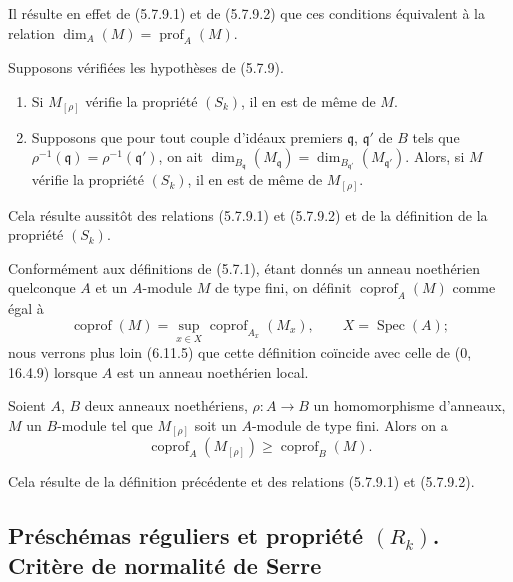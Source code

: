 Il résulte en effet de (5.7.9.1) et de (5.7.9.2) que ces conditions
équivalent à la relation
$\dim_A(M)=\operatorname{prof}_A(M)$.

\begin{corollary}[5.7.11]
\label{IV.2.s5.7.11-fr}
Supposons vérifiées les hypothèses de (5.7.9).
\begin{enumerate}
\item[(i)] Si $M_{[\rho]}$ vérifie la propriété $(S_k)$, il en est de même
de $M$.
\item[(ii)] Supposons que pour tout couple d'idéaux premiers
$\mathfrak q$, $\mathfrak q'$ de $B$ tels que
$\rho^{-1}(\mathfrak q)=\rho^{-1}(\mathfrak q')$, on ait
$\dim_{B_{\mathfrak q}}(M_{\mathfrak q})
=\dim_{B_{\mathfrak q'}}(M_{\mathfrak q'})$. Alors, si $M$ vérifie la
propriété $(S_k)$, il en est de même de $M_{[\rho]}$.
\end{enumerate}
\end{corollary}


Cela résulte aussitôt des relations (5.7.9.1) et (5.7.9.2) et de la
définition de la propriété $(S_k)$.

\begin{env}[5.7.12]
\label{IV.2.s5.7.12-fr}
Conformément aux définitions de (5.7.1), étant donnés un anneau noethérien
quelconque $A$ et un $A$-module $M$ de type fini, on définit
$\operatorname{coprof}_A(M)$ comme égal à
\[
\operatorname{coprof}(M)=\sup_{x\in X}
\operatorname{coprof}_{A_x}(M_x),\qquad X=\operatorname{Spec}(A);
\]
nous verrons plus loin (6.11.5) que cette définition coïncide avec celle de
(0, 16.4.9) lorsque $A$ est un anneau noethérien local.
\end{env}

\begin{corollary}[5.7.13]
\label{IV.2.s5.7.13-fr}
Soient $A$, $B$ deux anneaux noethériens, $\rho:A\to B$ un homomorphisme
d'anneaux, $M$ un $B$-module tel que $M_{[\rho]}$ soit un $A$-module de type
fini. Alors on a
\begin{equation}
\operatorname{coprof}_A(M_{[\rho]})\geq\operatorname{coprof}_B(M).
\tag{5.7.13.1}\label{IV.2.s5.7.13.1-fr}
\end{equation}
\end{corollary}

Cela résulte de la définition précédente et des relations (5.7.9.1) et
(5.7.9.2).

\subsection{Préschémas réguliers et propriété $(R_k)$. Critère de normalité de Serre}

